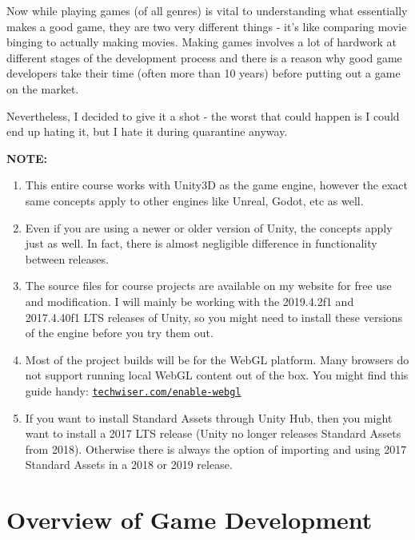 \documentclass{article}[a4paper,12pt]
\theoremstyle{definition}
\begin{document}
Now while playing games (of all genres) is vital to understanding what essentially makes a good game, they are two very different things - it's like comparing movie binging to actually making movies. Making games involves a lot of hardwork at different stages of the development process and there is a reason why good game developers take their time (often more than 10 years) before putting out a game on the market.
\vspace{6pt}

Nevertheless, I decided to give it a shot - the worst that could happen is I could end up hating it, but I hate it during quarantine anyway.

\hrulefill
\vspace{6pt}

\textbf{NOTE:} 
\begin{enumerate}
	\item This entire course works with Unity3D as the game engine, however the exact same concepts apply to other engines like Unreal, Godot, etc as well.
	\item Even if you are using a newer or older version of Unity, the concepts apply just as well. In fact, there is almost negligible difference in functionality between releases.
	\item The source files for course projects are available on my website for free use and modification. I will mainly be working with the 2019.4.2f1 and 2017.4.40f1 LTS releases of Unity, so you might need to install these versions of the engine before you try them out.
	\item Most of the project builds will be for the WebGL platform. Many browsers do not support running local WebGL content out of the box. You might find this guide handy: \texttt{\href{techwiser.com/enable-webgl}{techwiser.com/enable-webgl}}
	\item If you want to install Standard Assets through Unity Hub, then you might want to install a 2017 LTS release (Unity no longer releases Standard Assets from 2018). Otherwise there is always the option of importing and using 2017 Standard Assets in a 2018 or 2019 release.
\end{enumerate}
\hrulefill
\pagebreak

\section{Overview of Game Development}
\end{document}
